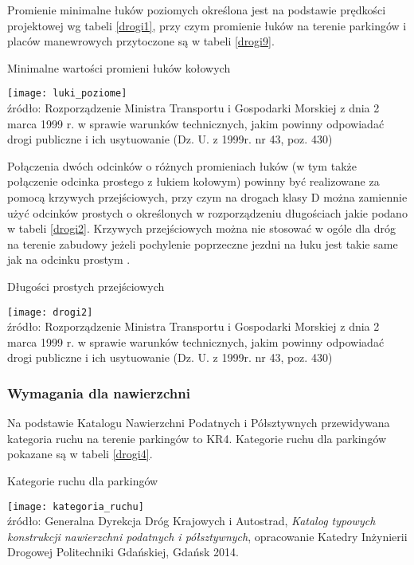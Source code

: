 \documentclass[twoside,12pt]{article}
\begin{document}
	Promienie minimalne łuków poziomych określona jest na podstawie prędkości projektowej wg tabeli \ref{drogi1}, przy czym promienie łuków na terenie parkingów i placów manewrowych przytoczone są w tabeli \ref{drogi9}.
	\begin{table}[H]
		\centering
		\caption{Minimalne wartości promieni łuków kołowych}
		\texttt{[image: luki\_poziome]}\\
		\footnotesize{źródło: Rozporządzenie Ministra Transportu i Gospodarki Morskiej z dnia 2 marca 1999 r. w sprawie warunków %
		technicznych, jakim powinny odpowiadać drogi publiczne i ich usytuowanie (Dz. U. z 1999r. nr 43, poz. 430) %
		\cite{rozporzadzenie_drogi}}
		\label{drogi1}
	\end{table}
	
	Połączenia dwóch odcinków o różnych promieniach łuków (w tym także połączenie odcinka prostego z łukiem kołowym) powinny być realizowane za pomocą krzywych przejściowych, przy czym na drogach klasy D można zamiennie użyć odcinków prostych o określonych w rozporządzeniu długościach jakie podano w tabeli \ref{drogi2}. Krzywych przejściowych można nie stosować w ogóle dla dróg na terenie zabudowy jeżeli pochylenie poprzeczne jezdni na łuku jest takie same jak na odcinku prostym \cite{rozporzadzenie_drogi}.
		\begin{table}[H]
		\centering
		\caption{Długości prostych przejściowych}
		\texttt{[image: drogi2]}\\
		\footnotesize{źródło: Rozporządzenie Ministra Transportu i Gospodarki Morskiej z dnia 2 marca 1999 r. w sprawie warunków %
		technicznych, jakim powinny odpowiadać drogi publiczne i ich usytuowanie (Dz. U. z 1999r. nr 43, poz. 430) %
		\cite{rozporzadzenie_drogi}}
		\label{drogi2}
	\end{table}
	
	\subsubsection{Wymagania dla nawierzchni}
	
	Na podstawie Katalogu Nawierzchni Podatnych i Półsztywnych przewidywana kategoria ruchu na terenie parkingów to KR4. Kategorie ruchu dla parkingów pokazane są w tabeli \ref{drogi4}. 
		\begin{table}[H]
		\centering
		\caption{Kategorie ruchu dla parkingów}
		\texttt{[image: kategoria\_ruchu]}\\
		\footnotesize{źródło: Generalna Dyrekcja Dróg Krajowych i Autostrad, \emph{Katalog typowych konstrukcji nawierzchni podatnych i półsztywnych}, opracowanie Katedry Inżynierii Drogowej Politechniki Gdańskiej, Gdańsk 2014. \cite{knd_podatne}}
		\label{drogi4}
	\end{table}	
	
\end{document}
